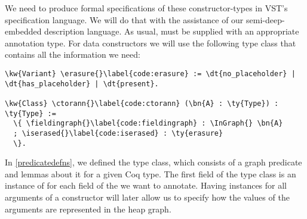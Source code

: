 

We need to produce formal specifications of these constructor-types in VST's specification language. We will do that with the assistance of our \reified{} semi-deep-embedded description language. As usual, \reified{} must be supplied with an appropriate annotation type. For \gls{data constructor}s we will use the following type class that contains all the information we need:

\newcommand{\ctorann}{\hyperref[code:ctorann]{\ty{ctor\_\linebreak[0]ann}}}
\newcommand{\fieldingraph}{\hyperref[code:fieldingraph]{\fn{field\_\linebreak[0]in\_\linebreak[0]graph}}}
\newcommand{\erasure}{\hyperref[code:erasure]{\ty{erasure}}}
\newcommand{\iserased}{\hyperref[code:iserased]{\fn{is\_\linebreak[0]erased}}}
\begin{Verbatim}
\kw{Variant} \erasure{}\label{code:erasure} := \dt{no_placeholder} | \dt{has_placeholder} | \dt{present}.

\kw{Class} \ctorann{}\label{code:ctorann} (\bn{A} : \ty{Type}) : \ty{Type} :=
  \{ \fieldingraph{}\label{code:fieldingraph} : \InGraph{} \bn{A}
  ; \iserased{}\label{code:iserased} : \ty{erasure}
  \}.
\end{Verbatim}

In \autoref{predicatedefns}, we defined the \InGraph{} type class, which consists of a graph predicate and lemmas about it for a given Coq type.
The first field of the \ctorann{} type class is an instance of \InGraph{} for each field of the \constructor{} we want to annotate. Having \InGraph{} instances for all arguments of a constructor will later allow us to specify how the values of the arguments are represented in the heap graph.

